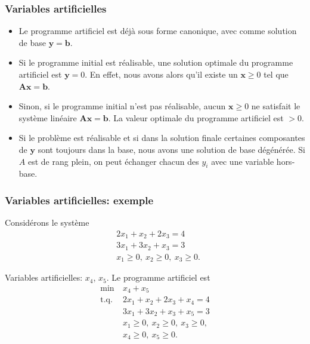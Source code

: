 \documentclass[usepdftitle=false]{beamer}
\def\bb{\boldsymbol{b}}
\def\bx{\boldsymbol{x}}
\def\by{\boldsymbol{y}}
\def\bA{\boldsymbol{A}}
\begin{document}
\begin{frame}
\frametitle{Variables artificielles}

\begin{itemize}
\item 
Le programme artificiel est déjà sous forme canonique, avec comme solution de base $\by = \bb$.
\item 
Si le programme initial est réalisable, une solution optimale du programme artificiel est $\by = 0$.
En effet, nous avons alors qu'il existe un $\bx \geq 0$ tel que $\bA\bx = \bb$.
\item
Sinon, si le programme initial n'est pas réalisable, aucun $\bx \geq 0$ ne satisfait le système linéaire $\bA \bx = \bb$.
La valeur optimale du programme artificiel est $> 0$.
\item 
Si le problème est réalisable et si dans la solution finale certaines composantes de $\by$ sont toujours dans la base, nous avons une solution de base dégénérée. Si $A$ est de rang plein, on peut échanger chacun des $y_i$ avec une variable hors-base.
\end{itemize}

\end{frame}

\begin{frame}
\frametitle{Variables artificielles: exemple}

Considérons le système
\begin{align*}
& 2x_1 + x_2 + 2x_3 = 4 \\
& 3x_1 + 3x_2 + x_3 = 3 \\
& x_1 \geq 0,\ x_2 \geq 0,\ x_3 \geq 0.
\end{align*}

\mbox{}

Variables artificielles: $x_4$, $x_5$. Le programme artificiel est
\begin{align*}
\min\ & x_4 + x_5 \\
\mbox{t.q. }
& 2x_1 + x_2 + 2x_3 + x_4 = 4 \\
& 3x_1 + 3x_2 + x_3 + x_5 = 3 \\
& x_1 \geq 0,\ x_2 \geq 0,\ x_3 \geq 0, \\
& x_4 \geq 0,\ x_5 \geq 0.
\end{align*}

\end{frame}
\end{document}
